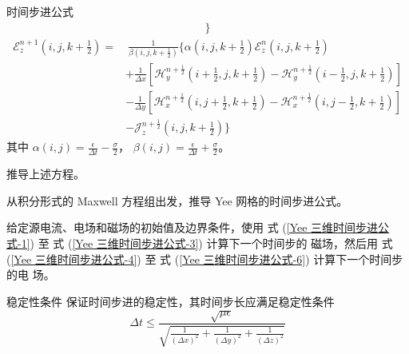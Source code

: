 \begin{theorem}{时间步进公式}
\begin{equation}
\begin{aligned}
            \Bigg\}
        \end{aligned}
        \label{Yee 三维时间步进公式-5}
    \end{equation}
    \begin{equation}
        \begin{aligned}
            \mathscr{E}_z^{n+1}\left(i,j,k+\frac{1}{2}\right)=
            &\ \frac{1}{\beta\left(i,j,k+\frac{1}{2}\right)}
            \Bigg\{\alpha\left(i,j,k+\frac{1}{2}\right)
            \mathscr{E}_z^n\left(i,j,k+\frac{1}{2}\right)\\
            &+\frac{1}{\Delta x}\left[
                \mathscr{H}_y^{n+\frac{1}{2}}\left(i+\frac{1}{2},j,k+\frac{1}{2}\right)
                -\mathscr{H}_y^{n+\frac{1}{2}}\left(i-\frac{1}{2},j,k+\frac{1}{2}\right)
            \right]\\
            &-\frac{1}{\Delta y}\left[
                \mathscr{H}_x^{n+\frac{1}{2}}\left(i,j+\frac{1}{2},k+\frac{1}{2}\right)
                -\mathscr{H}_x^{n+\frac{1}{2}}\left(i,j-\frac{1}{2},k+\frac{1}{2}\right)
            \right]\\
            &-\mathscr{J}_z^{n+\frac{1}{2}}\left(i,j,k+\frac{1}{2}\right)
            \Bigg\}
        \end{aligned}
        \label{Yee 三维时间步进公式-6}
    \end{equation}
    其中 $\alpha(i,j)=\frac{\epsilon}{\Delta t}-\frac{\sigma}{2}$，
    $\beta(i,j)=\frac{\epsilon}{\Delta t}+\frac{\sigma}{2}$。
\end{theorem}

\begin{exercise}
    推导上述方程。
\end{exercise}

\begin{exercise}
    从积分形式的 Maxwell 方程组出发，推导 Yee 网格的时间步进公式。
\end{exercise}

\par 给定源电流、电场和磁场的初始值及边界条件，使用
式 (\ref{Yee 三维时间步进公式-1}) 至
式 (\ref{Yee 三维时间步进公式-3}) 计算下一个时间步的
磁场，然后用
式 (\ref{Yee 三维时间步进公式-4}) 至
式 (\ref{Yee 三维时间步进公式-6}) 计算下一个时间步的电
场。

\begin{theorem}{稳定性条件}
    保证时间步进的稳定性，其时间步长应满足稳定性条件
    \begin{equation}
        \Delta t \leq \frac{\sqrt{\mu \epsilon}}
        {\sqrt{\frac{1}{(\Delta x)^2}+\frac{1}{(\Delta y)^2}+\frac{1}{(\Delta z)^2}}}
    \end{equation}
\end{theorem}

